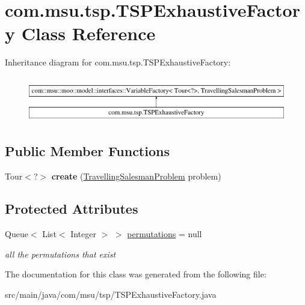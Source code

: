 \hypertarget{classcom_1_1msu_1_1tsp_1_1TSPExhaustiveFactory}{\section{com.\-msu.\-tsp.\-T\-S\-P\-Exhaustive\-Factory Class Reference}
\label{classcom_1_1msu_1_1tsp_1_1TSPExhaustiveFactory}
}
Inheritance diagram for com.\-msu.\-tsp.\-T\-S\-P\-Exhaustive\-Factory\-:\begin{figure}[H]
\begin{center}
\leavevmode
\includegraphics[height=2.000000cm]{classcom_1_1msu_1_1tsp_1_1TSPExhaustiveFactory}
\end{center}
\end{figure}
\subsection*{Public Member Functions}
\begin{DoxyCompactItemize}
\item 
\hypertarget{classcom_1_1msu_1_1tsp_1_1TSPExhaustiveFactory_ad288064f0d4a6615eae0cb1e870f571a}{Tour$<$?$>$ {\bfseries create} (\hyperlink{classcom_1_1msu_1_1tsp_1_1TravellingSalesmanProblem}{Travelling\-Salesman\-Problem} problem)}\label{classcom_1_1msu_1_1tsp_1_1TSPExhaustiveFactory_ad288064f0d4a6615eae0cb1e870f571a}

\end{DoxyCompactItemize}
\subsection*{Protected Attributes}
\begin{DoxyCompactItemize}
\item 
\hypertarget{classcom_1_1msu_1_1tsp_1_1TSPExhaustiveFactory_aca52802a2fab96853892e8b0a83df1bb}{Queue$<$ List$<$ Integer $>$ $>$ \hyperlink{classcom_1_1msu_1_1tsp_1_1TSPExhaustiveFactory_aca52802a2fab96853892e8b0a83df1bb}{permutations} = null}\label{classcom_1_1msu_1_1tsp_1_1TSPExhaustiveFactory_aca52802a2fab96853892e8b0a83df1bb}

\begin{DoxyCompactList}\small\item\em all the permutations that exist \end{DoxyCompactList}\end{DoxyCompactItemize}


The documentation for this class was generated from the following file\-:\begin{DoxyCompactItemize}
\item 
src/main/java/com/msu/tsp/T\-S\-P\-Exhaustive\-Factory.\-java\end{DoxyCompactItemize}
